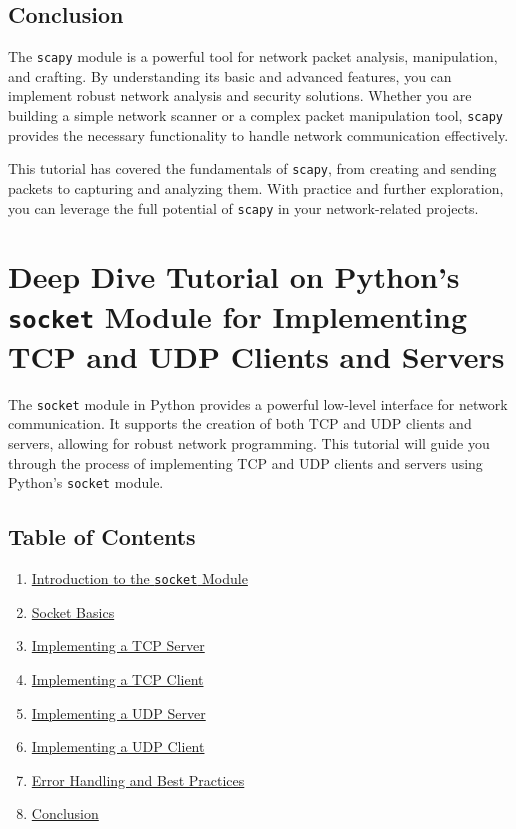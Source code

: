 \documentclass[
  letterpaper,
  DIV=11,
  numbers=noendperiod]{scrreprt}
\providecommand{\tightlist}{%
  \setlength{\itemsep}{0pt}\setlength{\parskip}{0pt}}\usepackage{longtable,booktabs,array}
\begin{document}
\section{Conclusion}\label{conclusion-44}

The \texttt{scapy} module is a powerful tool for network packet
analysis, manipulation, and crafting. By understanding its basic and
advanced features, you can implement robust network analysis and
security solutions. Whether you are building a simple network scanner or
a complex packet manipulation tool, \texttt{scapy} provides the
necessary functionality to handle network communication effectively.

This tutorial has covered the fundamentals of \texttt{scapy}, from
creating and sending packets to capturing and analyzing them. With
practice and further exploration, you can leverage the full potential of
\texttt{scapy} in your network-related projects.


\chapter{\texorpdfstring{Deep Dive Tutorial on Python's \texttt{socket}
Module for Implementing TCP and UDP Clients and
Servers}{Deep Dive Tutorial on Python's socket Module for Implementing TCP and UDP Clients and Servers}}\label{deep-dive-tutorial-on-pythons-socket-module-for-implementing-tcp-and-udp-clients-and-servers}

The \texttt{socket} module in Python provides a powerful low-level
interface for network communication. It supports the creation of both
TCP and UDP clients and servers, allowing for robust network
programming. This tutorial will guide you through the process of
implementing TCP and UDP clients and servers using Python's
\texttt{socket} module.

\section{Table of Contents}\label{table-of-contents-18}

\begin{enumerate}
\def\labelenumi{\arabic{enumi}.}
\tightlist
\item
  \hyperref[introduction-to-the-socket-module]{Introduction to the
  \texttt{socket} Module}
\item
  \hyperref[socket-basics]{Socket Basics}
\item
  \hyperref[implementing-a-tcp-server]{Implementing a TCP Server}
\item
  \hyperref[implementing-a-tcp-client]{Implementing a TCP Client}
\item
  \hyperref[implementing-a-udp-server]{Implementing a UDP Server}
\item
  \hyperref[implementing-a-udp-client]{Implementing a UDP Client}
\item
  \hyperref[error-handling-and-best-practices]{Error Handling and Best
  Practices}
\item
  \hyperref[conclusion]{Conclusion}
\end{enumerate}
\end{document}

